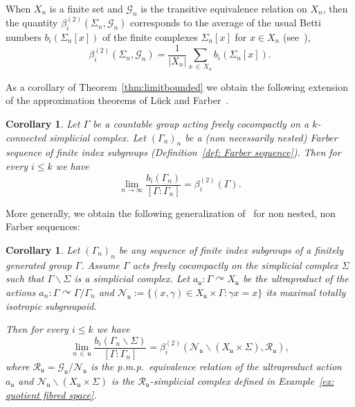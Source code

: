 \documentclass[10pt]{amsart}
\newtheorem{coro}[cdrthm]{Corollary}
\theoremstyle{definition}
\newcommand{\acting}{\curvearrowright}
\newcommand{\RR}{\mathcal{R}}
\newcommand{\cn}{\mathcal{N}}
\newcommand{\cg}{\mathcal{G}}
\newcommand{\ul}{\mathfrak{u}}
\newcommand{\pmp}{p.m.p.\ }
\begin{document}
When $X_n$ is a finite set and $\cg_n$ is the transitive equivalence relation on $X_n$, then the quantity $\beta^{(2)}_i(\Sigma_n,\cg_n)$ corresponds to the average of the usual Betti numbers $b_i(\Sigma_n[x])$ of the finite complexes $\Sigma_n[x]$ for $x\in X_n$ (see~\cite[Proposition~2.3]{berggab}),
\[
\beta^{(2)}_i\left(\Sigma_n,\cg_n\right)=\frac{1}{|X_n|}\sum_{x\,\in\,X_n} b_i(\Sigma_n[x]).
\]


As a corollary of Theorem~\ref{thm:limitbounded} we obtain the following extension of the approximation theorems of L\"uck and Farber~\cite{Farber-1998-L2-approx,Luc94b}.

\begin{coro}\label{cor:approxgroups}
Let $\Gamma$ be a countable group acting freely cocompactly on a $k$-connected simplicial complex. Let $(\Gamma_n)_n$ be a (non necessarily nested) Farber sequence of finite index subgroups (Definition~\eqref{def: Farber sequence}). Then for every $i\leq k$ we have
\[
\lim\limits_{n\to \infty}\frac{b_i(\Gamma_n)}{[\Gamma:\Gamma_n]}=\beta^{(2)}_i(\Gamma).
\]
\end{coro}

More generally, we obtain the following generalization of~\cite[Théorème~3.1]{berggab} for non nested, non Farber sequences:
\begin{coro}\label{Cor: non Farber sq}
Let $(\Gamma_n)_n$ be any sequence of finite index subgroups of a finitely generated group $\Gamma$. Assume $\Gamma$ acts freely cocompactly on the simplicial complex $\Sigma$ such that $\Gamma\backslash \Sigma$ is a simplicial complex. Let $a_{\ul}:\Gamma\acting X_{\ul}$ be the ultraproduct of the actions $a_n:\Gamma\acting \Gamma/\Gamma_n$ and $\cn_\ul:=\{(x,\gamma)\in X_{\ul}\times \Gamma: \gamma x=x\} $ its maximal totally isotropic subgroupoid.

Then for every $i\leq k$ we have
\[
\lim\limits_{n\,\in\,\ul}\frac{b_i(\Gamma_n\backslash \Sigma)}{[\Gamma:\Gamma_n]}=\beta^{(2)}_i\left(\cn_\ul \backslash \left(X_{\ul}\times \Sigma\right), \RR_{\ul}\right),
\]
where $\RR_\ul=\cg_\ul/\cn_\ul$ is the \pmp equivalence relation of the ultraproduct action $a_\ul$ and $\cn_\ul \backslash \left(X_{\ul}\times \Sigma\right)$ is the $\RR_{\ul}$-simplicial complex defined in Example~\ref{ex: quotient fibred space}.
\end{coro}
\end{document}
